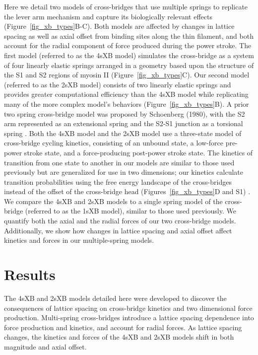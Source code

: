 \documentclass[10pt]{article}
\newcommand{\citep}[1]{\cite{#1}} %
\begin{document}
Here we detail two models of cross-bridges that use multiple springs to replicate the lever arm mechanism and capture its biologically relevant effects (Figure~\ref{fig_xb_types}B-C).  
Both models are affected by changes in lattice spacing as well as axial offset from binding sites along the thin filament, and both account for the radial component of force produced during the power stroke.  
The first model (referred to as the 4sXB model) simulates the cross-bridge as a system of four linearly elastic springs arranged in a geometry based upon the structure of the S1 and S2 regions of myosin II (Figure~\ref{fig_xb_types}C).  
Our second model (referred to as the 2sXB model) consists of two linearly elastic springs and provides greater computational efficiency than the 4sXB model while replicating many of the more complex model's behaviors (Figure~\ref{fig_xb_types}B). 
A prior two spring cross-bridge model was proposed by Schoenberg (1980), with the S2 arm represented as an extensional spring and the S2-S1 junction as a torsional spring \citep{Schoenberg1980a, Schoenberg1980b}. 
Both the 4sXB model and the 2sXB model use a three-state model of cross-bridge cycling kinetics, consisting of an unbound state, a low-force pre-power stroke state, and a force-producing post-power stroke state. 
The kinetics of transition from one state to another in our models are similar to those used previously but are generalized for use in two dimensions; our kinetics calculate transition probabilities using the free energy landscape of the cross-bridges instead of the offset of the cross-bridge head (Figures~\ref{fig_xb_types}D and S1) \citep{Pate1989, Daniel1998, Takagi2004, Tanner2007}. 
We compare the 4sXB and 2sXB models to a single spring model of the cross-bridge (referred to as the 1sXB model), similar to those used previously. 
We quantify both the axial and the radial forces of our two cross-bridge models. 
Additionally, we show how changes in lattice spacing and axial offset affect kinetics and forces in our multiple-spring models. 


\section*{Results} %

The 4sXB and 2sXB models detailed here were developed to discover the consequences of lattice spacing on cross-bridge kinetics and two dimensional force production.
Multi-spring cross-bridges introduce a lattice spacing dependence into force production and kinetics, and account for radial forces. 
As lattice spacing changes, the kinetics and forces of the 4sXB and 2sXB models shift in both magnitude and axial offset.
\end{document}
